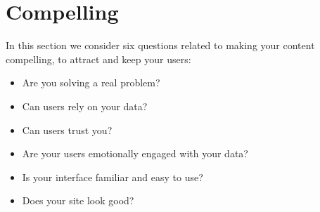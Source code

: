 \section{Compelling}

In this section we consider six questions related to making your content compelling, to attract and keep your users:

\begin{itemize}
    \item Are you solving a real problem?
    \item Can users rely on your data?
    \item Can users trust you?
    \item Are your users emotionally engaged with your data?
    \item Is your interface familiar and easy to use?
    \item Does your site look good?
\end{itemize}






